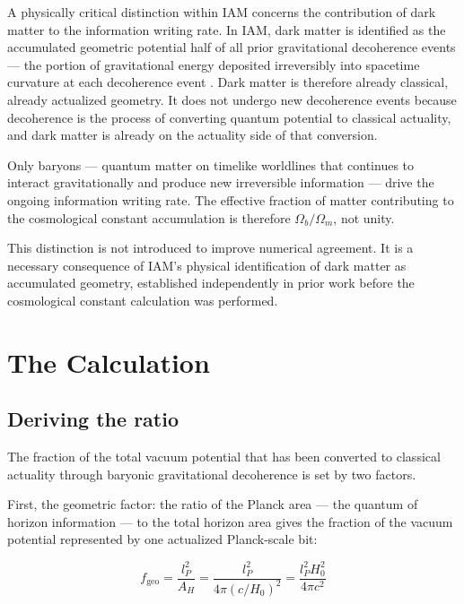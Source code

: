 \documentclass[12pt,a4paper]{article}
\begin{document}
A physically critical distinction within IAM concerns the contribution
of dark matter to the information writing rate. In IAM, dark matter is
identified as the accumulated geometric potential half of all prior
gravitational decoherence events — the portion of gravitational energy
deposited irreversibly into spacetime curvature at each decoherence event
\citep{mahaffey2026_virial_dm}. Dark matter is therefore already
classical, already actualized geometry. It does not undergo new
decoherence events because decoherence is the process of converting
quantum potential to classical actuality, and dark matter is already on
the actuality side of that conversion.

Only baryons — quantum matter on timelike worldlines that continues to
interact gravitationally and produce new irreversible information — drive
the ongoing information writing rate. The effective fraction of matter
contributing to the cosmological constant accumulation is therefore
$\Omega_b/\Omega_m$, not unity.

This distinction is not introduced to improve numerical agreement. It is
a necessary consequence of IAM's physical identification of dark matter
as accumulated geometry, established independently in prior work
\citep{mahaffey2026_virial_dm} before the cosmological constant
calculation was performed.

\section{The Calculation}
\label{sec:calculation}

\subsection{Deriving the ratio}

The fraction of the total vacuum potential that has been converted to
classical actuality through baryonic gravitational decoherence is set by
two factors.

First, the geometric factor: the ratio of the Planck area — the quantum
of horizon information — to the total horizon area gives the fraction of
the vacuum potential represented by one actualized Planck-scale bit:

\begin{equation}
f_\mathrm{geo} = \frac{l_P^2}{A_H} =
\frac{l_P^2}{4\pi(c/H_0)^2} =
\frac{l_P^2 H_0^2}{4\pi c^2}
\label{eq:f_geo}
\end{equation}
\end{document}
